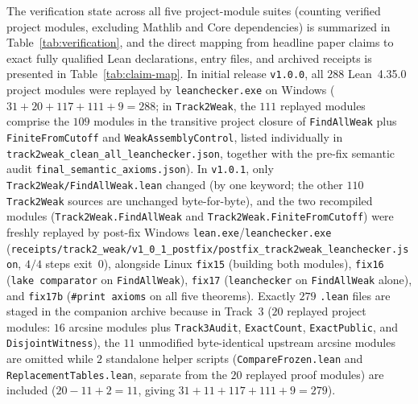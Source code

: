 \documentclass[11pt,a4paper]{article}
\theoremstyle{definition}
\theoremstyle{remark}
\begin{document}
The verification state across all five project-module suites (counting verified project modules, excluding Mathlib and Core dependencies) is summarized in Table~\ref{tab:verification}, and the direct mapping from headline paper claims to exact fully qualified Lean declarations, entry files, and archived receipts is presented in Table~\ref{tab:claim-map}. In initial release \texttt{v1.0.0}, all \(288\) Lean~4.35.0 project modules were replayed by \texttt{leanchecker.exe} on Windows (\(31 + 20 + 117 + 111 + 9 = 288\); in \texttt{Track2Weak}, the \(111\) replayed modules comprise the \(109\) modules in the transitive project closure of \texttt{FindAllWeak} plus \texttt{FiniteFromCutoff} and \texttt{WeakAssemblyControl}, listed individually in \texttt{track2weak\_clean\_all\_leanchecker.json}, together with the pre-fix semantic audit \texttt{final\_semantic\_axioms.json}). In \texttt{v1.0.1}, only \texttt{Track2Weak/FindAllWeak.lean} changed (by one keyword; the other \(110\) \texttt{Track2Weak} sources are unchanged byte-for-byte), and the two recompiled modules (\texttt{Track2Weak.FindAllWeak} and \texttt{Track2Weak.FiniteFromCutoff}) were freshly replayed by post-fix Windows \texttt{lean.exe}/\texttt{leanchecker.exe} (\texttt{receipts/\allowbreak track2\_weak/\allowbreak v1\_0\_1\_postfix/\allowbreak postfix\_track2weak\_\allowbreak leanchecker.json}, \(4/4\) steps exit~\(0\)), alongside Linux \texttt{fix15} (building both modules), \texttt{fix16} (\texttt{lake comparator} on \texttt{FindAllWeak}), \texttt{fix17} (\texttt{leanchecker} on \texttt{FindAllWeak} alone), and \texttt{fix17b} (\texttt{\#print axioms} on all five theorems). Exactly \(279\) \texttt{.lean} files are staged in the companion archive because in Track~3 (\(20\) replayed project modules: \(16\) arcsine modules plus \texttt{Track3Audit}, \texttt{ExactCount}, \texttt{ExactPublic}, and \texttt{DisjointWitness}), the \(11\) unmodified byte-identical upstream arcsine modules are omitted while \(2\) standalone helper scripts (\texttt{CompareFrozen.lean} and \texttt{ReplacementTables.lean}, separate from the \(20\) replayed proof modules) are included (\(20 - 11 + 2 = 11\), giving \(31 + 11 + 117 + 111 + 9 = 279\)).
\end{document}

